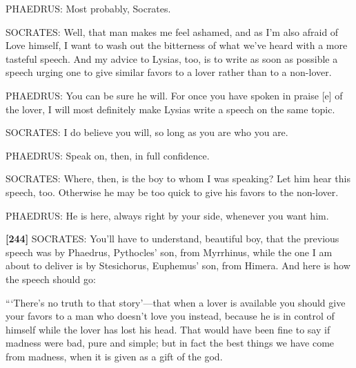 PHAEDRUS: Most probably, Socrates.

SOCRATES: Well, that man makes me feel ashamed, and as I'm also afraid
of Love himself, I want to wash out the bitterness of what we've heard
with a more tasteful speech. And my advice to Lysias, too, is to write
as soon as possible a speech urging one to give similar favors to a
lover rather than to a non-lover.

PHAEDRUS: You can be sure he will. For once you have spoken in praise
{[}e{]} of the lover, I will most definitely make Lysias write a speech
on the same topic.

SOCRATES: I do believe you will, so long as you are who you are.

PHAEDRUS: Speak on, then, in full confidence.

SOCRATES: Where, then, is the boy to whom I was speaking? Let him hear
this speech, too. Otherwise he may be too quick to give his favors to
the non-lover.

PHAEDRUS: He is here, always right by your side, whenever you want him.

{\bf {[}244{]}} SOCRATES: You'll have to understand, beautiful boy, that
the previous speech was by Phaedrus, Pythocles' son, from Myrrhinus,
while the one I am about to deliver is by Stesichorus, Euphemus' son,
from Himera. And here
is how the speech should go:

“‘There's no truth to that story'---that when a lover is available you
should give your favors to a man who doesn't love you instead, because
he is in control of himself while the lover has lost his head. That
would have been fine to say if madness were bad, pure and simple; but in
fact the best things we have come from madness, when it is given as a
gift of the god.

